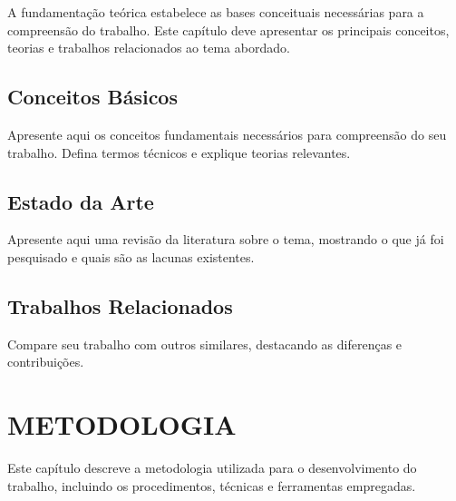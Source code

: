 \documentclass[12pt, a4paper, brazil, oneside]{abntex2}
\begin{document}
A fundamentação teórica estabelece as bases conceituais necessárias para a compreensão do trabalho. Este capítulo deve apresentar os principais conceitos, teorias e trabalhos relacionados ao tema abordado.

\section{Conceitos Básicos}

Apresente aqui os conceitos fundamentais necessários para compreensão do seu trabalho. Defina termos técnicos e explique teorias relevantes.

% 
%
%
%

\section{Estado da Arte}

Apresente aqui uma revisão da literatura sobre o tema, mostrando o que já foi pesquisado e quais são as lacunas existentes.

\section{Trabalhos Relacionados}

Compare seu trabalho com outros similares, destacando as diferenças e contribuições.


\chapter{METODOLOGIA}


Este capítulo descreve a metodologia utilizada para o desenvolvimento do trabalho, incluindo os procedimentos, técnicas e ferramentas empregadas.
\end{document}
